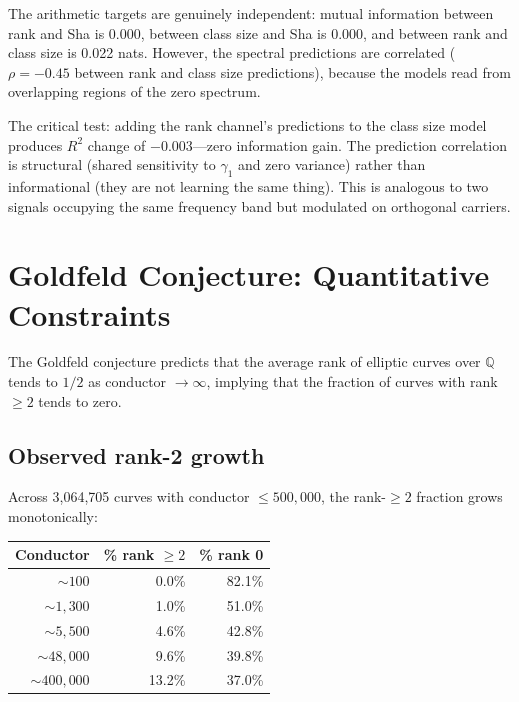 \documentclass[11pt,a4paper]{article}
\begin{document}
The arithmetic targets are genuinely independent: mutual information between rank and Sha is 0.000, between class size and Sha is 0.000, and between rank and class size is 0.022 nats. However, the spectral predictions are correlated ($\rho = -0.45$ between rank and class size predictions), because the models read from overlapping regions of the zero spectrum.

The critical test: adding the rank channel's predictions to the class size model produces $R^2$ change of $-0.003$---zero information gain. The prediction correlation is structural (shared sensitivity to $\gamma_1$ and zero variance) rather than informational (they are not learning the same thing). This is analogous to two signals occupying the same frequency band but modulated on orthogonal carriers.

\section{Goldfeld Conjecture: Quantitative Constraints}
\label{sec:goldfeld}

The Goldfeld conjecture predicts that the average rank of elliptic curves over $\mathbb{Q}$ tends to $1/2$ as conductor $\to \infty$, implying that the fraction of curves with rank ${\geq} 2$ tends to zero.

\subsection{Observed rank-2 growth}

Across 3,064,705 curves with conductor ${\leq} 500{,}000$, the rank-${\geq}2$ fraction grows monotonically:

\begin{center}
\begin{tabular}{rrr}
\toprule
\textbf{Conductor} & \textbf{\% rank ${\geq} 2$} & \textbf{\% rank 0} \\
\midrule
${\sim}100$ & 0.0\% & 82.1\% \\
${\sim}1{,}300$ & 1.0\% & 51.0\% \\
${\sim}5{,}500$ & 4.6\% & 42.8\% \\
${\sim}48{,}000$ & 9.6\% & 39.8\% \\
${\sim}400{,}000$ & 13.2\% & 37.0\% \\
\bottomrule
\end{tabular}
\end{center}
\end{document}
